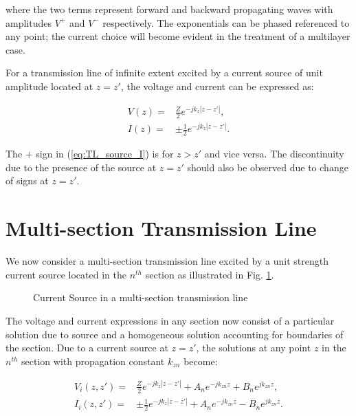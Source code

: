 \documentclass[11pt]{article}
\renewcommand{\^}{\hat}  %
\begin{document}
    where the two terms represent forward and backward propagating waves with amplitudes $V^+$ and $V^-$ respectively. The exponentials can be phased referenced to any point; the current choice will become evident in the treatment of a multilayer case.

    For a transmission line of infinite extent excited by a current source of unit amplitude located at $z = z'$, the voltage and current can be expressed as:

    \begin{subequations}
      \begin{align}
        V(z) ={}& \frac{Z}{2} e^{-jk_z \left|z-z'\right| },
        \label{eq:TL_source_V}\\
        I(z) ={}& \pm \frac{1}{2} e^{-jk_z \left|z-z'\right|}.
        \label{eq:TL_source_I}
      \end{align}
      \label{eq:TL_source}
    \end{subequations}

    The $+$ sign in (\ref{eq:TL_source_I}) is for $z > z'$ and vice versa. The discontinuity due to the presence of the source at $z = z'$ should also be observed due to change of signs at $ z = z'$.

    \section{Multi-section Transmission Line}

    We now consider a multi-section transmission line excited by a unit strength current source located in the $n^{th}$ section as illustrated in Fig. \ref{fig:TL}.

    \begin{figure}[h!]
      \centering
      
      \caption{Current Source in a multi-section transmission line}
      \label{fig:TL}
    \end{figure}

    The voltage and current expressions in any section now consist of a particular solution due to source and a homogeneous solution accounting for boundaries of the section. Due to a current source at $z = z'$, the solutions at any point $z$ in the $n^{th}$ section with propagation constant $k_{zn}$ become:

    \begin{subequations}
      \begin{align}
        V_i(z, z') ={}& \frac{Z}{2} e^{-jk_z \left|z-z'\right| } + A_n e^{-j k_{zn} z } + B_n e^{j k_{zn} z},
        \label{eq:multi_V}\\
        I_i(z, z') ={}& \pm \frac{1}{2} e^{-jk_z \left|z-z'\right|} + A_n e^{-j k_{zn} z } - B_n e^{j k_{zn} z}.
        \label{eq:multi_I}
      \end{align}
      \label{eq:multi}
    \end{subequations}
\end{document}

